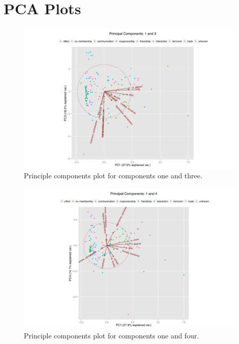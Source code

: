 \documentclass[3p,times]{elsarticle}
\begin{document}


\clearpage
\appendix

\section{PCA Plots}
 \label{sec:PCA Plots}

\begin{figure}
\begin{center}
	\caption{\label{fig:1 and 3} Principle components plot for components one and three.}
		\includegraphics[width = 0.98\textwidth]{./images/Observed_PCA_Components1_3.pdf}
\end{center}
\end{figure}

\begin{figure}
\begin{center}
	\caption{\label{fig:1 and 4} Principle components plot for components one and four.}
		\includegraphics[width = 0.98\textwidth]{./images/Observed_PCA_Components1_4.pdf}
\end{center}
\end{figure}
\end{document}
